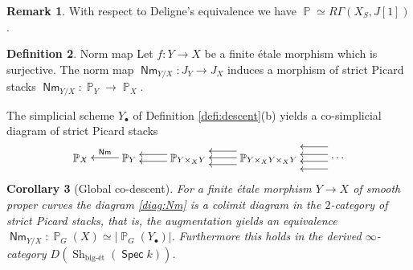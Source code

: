 \documentclass{article}
\DeclareMathOperator{\Sh}{Sh}
\DeclareMathOperator{\Pb}{\mathbb{P}}
\DeclareMathOperator{\Spec}{\mathsf{Spec}}
\DeclareMathOperator{\Nm}{\mathsf{Nm}}
\theoremstyle{definition}
\newtheorem{definition}{Definition}[section]
\newtheorem{rmk}[definition]{Remark}
\theoremstyle{plain}
\newtheorem{corollary}[definition]{Corollary}
\begin{document}
\begin{rmk}\label{rmk:RGamma}
With respect to Deligne's equivalence we have $\Pb \simeq R\Gamma(X_S,J[1])$.
\end{rmk}

\begin{definition}{Norm map}
Let $f\colon Y \to X$ be a finite \'etale morphism which is surjective. The norm map $\Nm_{Y/X}\colon J_Y \to J_X$ induces a morphism of strict Picard stacks $\Nm_{Y/X} \colon \Pb_Y \to \Pb_X$.
\end{definition}

The simplicial scheme $Y_{\bullet}$ of Definition \ref{defi:descent}(b) yields a co-simplicial diagram of strict Picard stacks
\begin{equation}\label{diag:Nm}
\xymatrix{
\Pb_{X} & \Pb_{Y} \ar[l]_{\Nm} & \Pb_{Y\times_X Y} \ar@<-0.7ex>[l] \ar@<0.7ex>[l] & \Pb_{Y \times_X Y \times_X Y} \ar@<-1.4ex>[l] \ar[l] \ar@<1.4ex>[l] & \cdots \ar@<-0.7ex>[l] \ar@<0.7ex>[l] \ar@<-2.3ex>[l] \ar@<2.3ex>[l] 
}
\end{equation}

\begin{corollary}[Global co-descent]\label{cor:co-descent}
For a finite \'etale morphism $Y \to X$ of smooth proper curves the diagram \eqref{diag:Nm} is a colimit diagram in the $2$-category of strict Picard stacks, that is, the augmentation yields an equivalence $\Nm_{Y/X}\colon \Pb_G(X) \simeq |\Pb_G(Y_{\bullet})|.$ Furthermore this holds in the derived $\infty$-category $D(\Sh_{\text{big-\'et}}(\Spec k))$.
\end{corollary}
\end{document}

